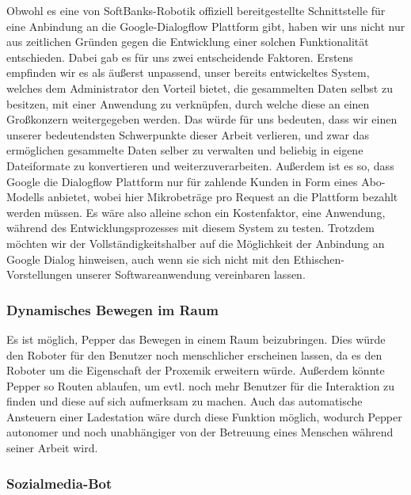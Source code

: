 Obwohl es eine von SoftBanks-Robotik offiziell bereitgestellte Schnittstelle für eine Anbindung an die Google-Dialogflow Plattform gibt, haben wir uns nicht nur aus zeitlichen Gründen gegen die Entwicklung einer solchen Funktionalität entschieden. Dabei gab es für uns zwei entscheidende Faktoren. Erstens empfinden wir es als äußerst unpassend, unser bereits entwickeltes System, welches dem Administrator den Vorteil bietet, die gesammelten Daten selbst zu besitzen, mit einer Anwendung zu verknüpfen, durch welche diese an einen Großkonzern weitergegeben werden. Das würde für uns bedeuten, dass wir einen unserer bedeutendsten Schwerpunkte dieser Arbeit verlieren, und zwar das ermöglichen gesammelte Daten selber zu verwalten und beliebig in eigene Dateiformate zu konvertieren und weiterzuverarbeiten. Außerdem ist es so, dass Google die Dialogflow Plattform nur für zahlende Kunden in Form eines Abo-Modells anbietet, wobei hier Mikrobeträge pro Request an die Plattform bezahlt werden müssen. Es wäre also alleine schon ein Kostenfaktor, eine Anwendung, während des Entwicklungsprozesses mit diesem System zu testen. Trotzdem möchten wir der Vollständigkeitshalber auf die Möglichkeit der Anbindung an Google Dialog hinweisen, auch wenn sie sich nicht mit den Ethischen-Vorstellungen unserer Softwareanwendung vereinbaren lassen.

\subsubsection{Dynamisches Bewegen im Raum}

Es ist möglich, Pepper das Bewegen in einem Raum beizubringen. Dies würde den Roboter für den Benutzer noch menschlicher erscheinen lassen, da es den Roboter um die Eigenschaft der Proxemik erweitern würde. Außerdem könnte Pepper so Routen ablaufen, um evtl. noch mehr Benutzer für die Interaktion zu finden und diese auf sich aufmerksam zu machen. Auch das automatische Ansteuern einer Ladestation wäre durch diese Funktion möglich, wodurch Pepper autonomer und noch unabhängiger von der Betreuung eines Menschen während seiner Arbeit wird.

\subsubsection{Sozialmedia-Bot}

